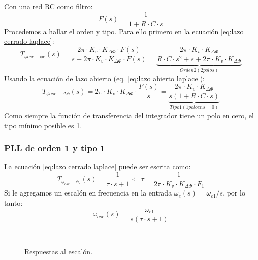 \documentclass[
	12pt, %
	fleqn, %
	a4paper, %
	oneside, %
]{LegrandOrangeBook}
\begin{document}
\begin{example}
Con una red RC como filtro:
\begin{displaymath}
F(s)=\frac{1}{1+R\cdot C\cdot s}
\end{displaymath}
Procedemos a hallar el orden y tipo. Para ello primero en la ecuación \ref{eq:lazo cerrado laplace}:
\begin{displaymath}
T_{\phi osc-\phi e}(s)=\frac{2\pi\cdot K_v\cdot K_{\Delta\Phi}\cdot F(s)}{s+2\pi\cdot K_v\cdot K_{\Delta\Phi}\cdot F(s)}=\underbrace{\frac{2\pi\cdot K_v\cdot K_{\Delta\Phi}}{R\cdot C\cdot s^2+s+2\pi\cdot K_v\cdot K_{\Delta\Phi}}}_{Orden 2(2 polos)}
\end{displaymath}
Usando la ecuación de lazo abierto (eq. \ref{eq:lazo abierto laplace}):
\begin{displaymath}
T_{\phi osc-\Delta\phi}(s)=2\pi\cdot K_v\cdot K_{\Delta\Phi}\cdot \frac{F(s)}{s}=\underbrace{\frac{2\pi\cdot K_v\cdot K_{\Delta\Phi}}{s(1+R\cdot C\cdot s)}}_{Tipo 1(1 polo en s=0)}
\end{displaymath}
Como siempre la función de transferencia del integrador tiene un polo en cero, el tipo mínimo posible es 1.
\end{example}
\subsubsection{PLL de orden 1 y tipo 1}
La ecuación \ref{eq:lazo cerrado laplace} puede ser escrita como:
\begin{displaymath}
T_{\phi_{osc}-\phi_e}(s)=\frac{1}{\tau\cdot s+1}\Leftarrow \tau=\frac{1}{2\pi\cdot K_v\cdot K_{\Delta\Phi}\cdot F_1}
\end{displaymath}
Si le agregamos un escalón en frecuencia en la entrada $\omega_e(s)=\omega_{e1}/s$, por lo tanto:
\begin{displaymath}
\omega_{osc}(s)=\frac{\omega_{e1}}{s(\tau\cdot s+1)}
\end{displaymath}
\begin{figure}[]
\centering
{}\\
\caption{Respuestas al escalón.}
\end{figure}
\end{document}
